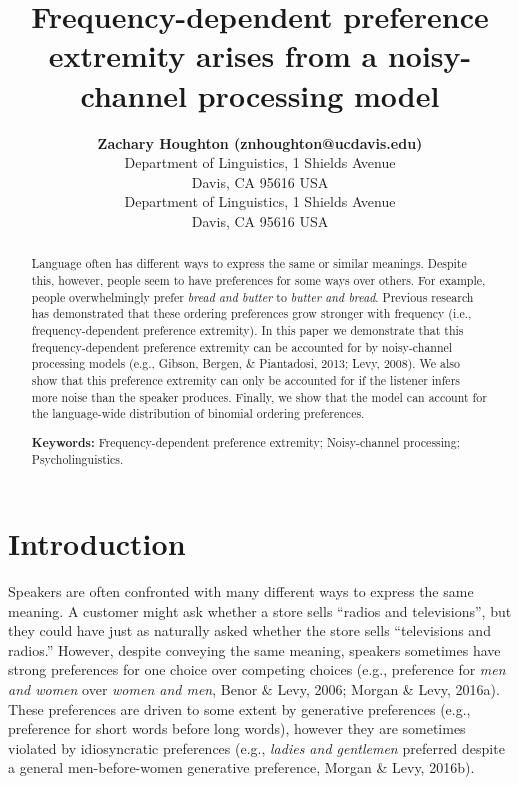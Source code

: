 \documentclass[10pt, letterpaper]{article}
\title{Frequency-dependent preference extremity arises from a
noisy-channel processing model}
\author{{\large \bf Zachary Houghton (znhoughton@ucdavis.edu)} \\ Department of Linguistics, 1 Shields Avenue \\ Davis, CA 95616 USA \AND {\large \bf Emily Morgan (eimorgan@ucdavis.edu)} \\ Department of Linguistics, 1 Shields Avenue \\ Davis, CA 95616 USA}
\begin{document}
\maketitle

\begin{abstract}
Language often has different ways to express the same or similar
meanings. Despite this, however, people seem to have preferences for
some ways over others. For example, people overwhelmingly prefer
\emph{bread and butter} to \emph{butter and bread}. Previous research
has demonstrated that these ordering preferences grow stronger with
frequency (i.e., frequency-dependent preference extremity). In this
paper we demonstrate that this frequency-dependent preference extremity
can be accounted for by noisy-channel processing models (e.g., Gibson,
Bergen, \& Piantadosi, 2013; Levy, 2008). We also show that this
preference extremity can only be accounted for if the listener infers
more noise than the speaker produces. Finally, we show that the model
can account for the language-wide distribution of binomial ordering
preferences.

\textbf{Keywords:}
Frequency-dependent preference extremity; Noisy-channel processing;
Psycholinguistics.
\end{abstract}


\hypertarget{introduction}{%
\section{Introduction}\label{introduction}}

Speakers are often confronted with many different ways to express the
same meaning. A customer might ask whether a store sells ``radios and
televisions'', but they could have just as naturally asked whether the
store sells ``televisions and radios.'' However, despite conveying the
same meaning, speakers sometimes have strong preferences for one choice
over competing choices (e.g., preference for \emph{men and women} over
\emph{women and men}, Benor \& Levy, 2006; Morgan \& Levy, 2016a). These
preferences are driven to some extent by generative preferences (e.g.,
preference for short words before long words), however they are
sometimes violated by idiosyncratic preferences (e.g., \emph{ladies and
gentlemen} preferred despite a general men-before-women generative
preference, Morgan \& Levy, 2016b).
\end{document}
